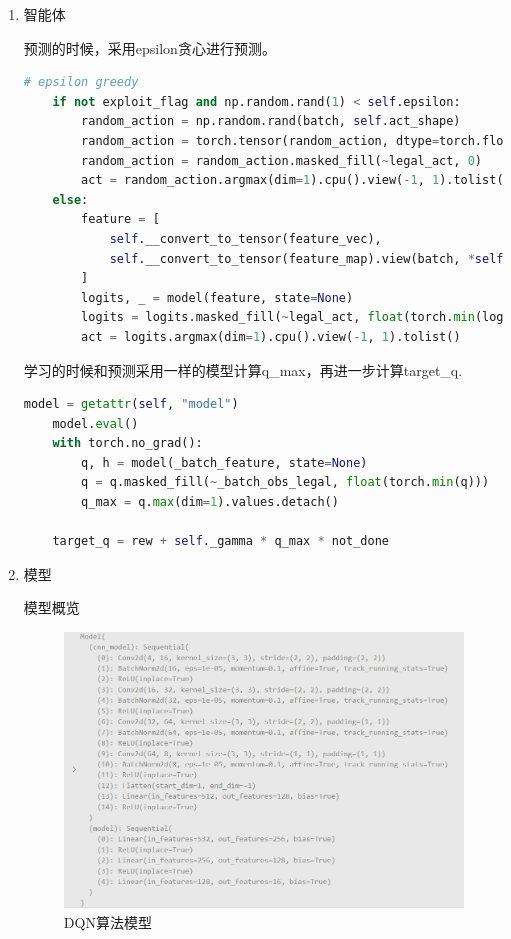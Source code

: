 \begin{enumerate}
    \item 智能体


预测的时候，采用epsilon贪心进行预测。
\begin{lstlisting}[language=Python]
    # epsilon greedy
    if not exploit_flag and np.random.rand(1) < self.epsilon:
        random_action = np.random.rand(batch, self.act_shape)
        random_action = torch.tensor(random_action, dtype=torch.float32).to(self.device)
        random_action = random_action.masked_fill(~legal_act, 0)
        act = random_action.argmax(dim=1).cpu().view(-1, 1).tolist()
    else:
        feature = [
            self.__convert_to_tensor(feature_vec),
            self.__convert_to_tensor(feature_map).view(batch, *self.obs_split[1]),
        ]
        logits, _ = model(feature, state=None)
        logits = logits.masked_fill(~legal_act, float(torch.min(logits)))
        act = logits.argmax(dim=1).cpu().view(-1, 1).tolist()
\end{lstlisting}

学习的时候和预测采用一样的模型计算q\_max，再进一步计算target\_q.
\begin{lstlisting}[language=Python]
    model = getattr(self, "model")
    model.eval()
    with torch.no_grad():
        q, h = model(_batch_feature, state=None)
        q = q.masked_fill(~_batch_obs_legal, float(torch.min(q)))
        q_max = q.max(dim=1).values.detach()

    target_q = rew + self._gamma * q_max * not_done
\end{lstlisting}

\item 模型

模型概览
\begin{figure}[H]
    \centering
    \includegraphics[width=0.8\linewidth]{pic/DQN-model.png}
    \caption{ DQN算法模型}
    \label{map}
\end{figure}



\end{enumerate}
